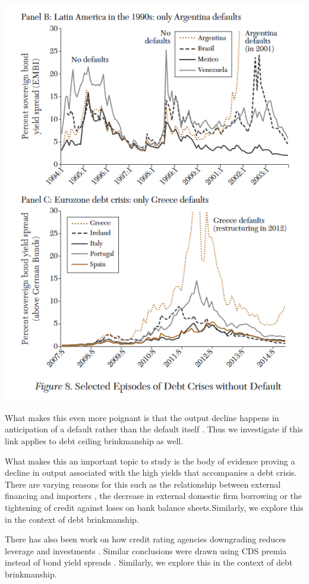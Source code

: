 \documentclass[
  12pt]{article}
\begin{document}
\includegraphics{style-guide/overtime_brink_2.png}

What makes this even more poignant is that the output decline happens in
anticipation of a default rather than the default itself
\citet{yeyati2011} . Thus we investigate if this link applies to debt
ceiling brinkmanship as well.

What makes this an important topic to study is the body of evidence
proving a decline in output associated with the high yields that
accompanies a debt crisis. There are varying reasons for this such as
the relationship between external financing and importers
\citet{mendoza2012} , the decrease in external domestic firm
borrowing\citep{corsetti2012, das2010, gourinchas2016} or the tightening
of credit against loses on bank balance
sheets\citep{arellano, ferrando2017}.Similarly, we explore this in the
context of debt brinkmanship.

There has also been work on how credit rating agencies downgrading
reduces leverage and investments \citet{almeida2017}. Similar
conclusions were drawn using CDS premia instead of bond yield spreads
\citep{brutti2015, bahaj2020}. Similarly, we explore this in the context
of debt brinkmanship.
\end{document}
